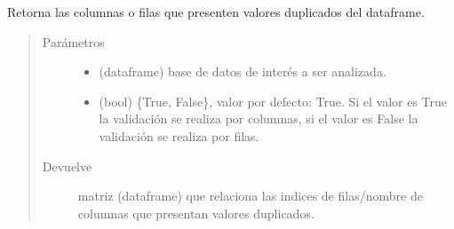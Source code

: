 \documentclass[letterpaper,10pt,openany,spanish]{sphinxmanual}
\begin{document}

\begin{fulllineitems}
\label{\detokenize{datos:datos.duplic}}
Retorna las columnas o filas que presenten valores duplicados del dataframe.
\begin{quote}\begin{description}
\item[{Parámetros}] \leavevmode\begin{itemize}
\item {} 
 \textendash{} (dataframe) base de datos de interés a ser analizada.

\item {} 
 \textendash{} (bool) \{True, False\}, valor por defecto: True. Si el valor es True la validación se realiza por columnas, si el valor es False la validación se realiza por filas.

\end{itemize}

\item[{Devuelve}] \leavevmode
matriz (dataframe) que relaciona las indices de filas/nombre de columnas que presentan valores duplicados.

\end{description}\end{quote}

\end{fulllineitems}

\end{document}
